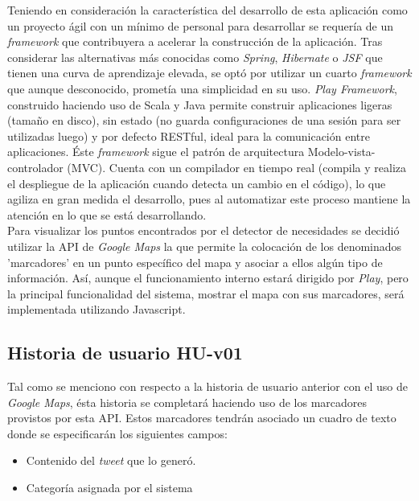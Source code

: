Teniendo en consideración la característica del desarrollo de esta aplicación como un proyecto ágil con un mínimo de personal para desarrollar se requería de un \textit{framework} que contribuyera a acelerar la construcción de la aplicación. Tras considerar las alternativas más conocidas como \textit{Spring}, \textit{Hibernate} o \textit{JSF} que tienen una curva de aprendizaje elevada, se optó por utilizar un cuarto \textit{framework} que aunque desconocido, prometía una simplicidad en su uso. \textit{Play Framework}, construido haciendo uso de Scala y Java permite construir aplicaciones ligeras (tamaño en disco), sin estado (no guarda configuraciones de una sesión para ser utilizadas luego) y por defecto RESTful, ideal para la comunicación entre aplicaciones. Éste \textit{framework} sigue el patrón de arquitectura Modelo-vista-controlador (MVC). Cuenta con un compilador en tiempo real (compila y realiza el despliegue de la aplicación cuando detecta un cambio en el código), lo que agiliza en gran medida el desarrollo, pues al automatizar este proceso mantiene la atención en lo que se está desarrollando.\\

Para visualizar los puntos encontrados por el detector de necesidades se decidió utilizar la API de \textit{Google Maps} la que permite la colocación de los denominados 'marcadores' en un punto específico del mapa y asociar a ellos algún tipo de información. Así, aunque el funcionamiento interno estará dirigido por \textit{Play}, pero la principal funcionalidad del sistema, mostrar el mapa con sus marcadores, será implementada utilizando Javascript.

\subsection{Historia de usuario HU-v01}
\label{subsec:HU-v01}

Tal como se menciono con respecto a la historia de usuario anterior con el uso de \textit{Google Maps}, ésta historia se completará haciendo uso de los marcadores provistos por esta API. Estos marcadores tendrán asociado un cuadro de texto donde se especificarán los siguientes campos:

\begin{itemize}
\item Contenido del \textit{tweet} que lo generó.
\item Categoría asignada por el sistema
\end{itemize}


